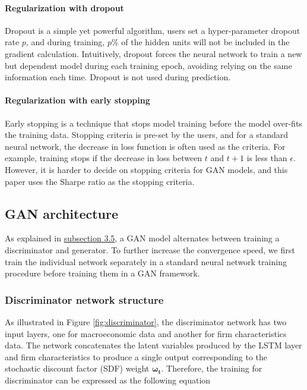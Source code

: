 \documentclass[12pt]{article}
\begin{document}
\hypertarget{regularization-with-dropout}{%
\paragraph{Regularization with dropout}\label{regularization-with-dropout}}

Dropout is a simple yet powerful algorithm, users set a
hyper-parameter dropout rate \(p\), and during training, \(p\)\%
of the hidden units will not be included in the gradient
calculation. Intuitively, dropout forces the neural network
to train a new but dependent model during each training
epoch, avoiding relying on the same information each time.
Dropout is not used during prediction.

\hypertarget{regularization-with-early-stopping}{%
\paragraph{Regularization with early stopping}\label{regularization-with-early-stopping}}

Early stopping is a technique that stops model training
before the model over-fits the training data. Stopping
criteria is pre-set by the users, and for a standard neural
network, the decrease in loss function is often used as the
criteria. For example, training stops if the decrease in loss between \(t\)
and \(t+1\) is less than \(\epsilon\). However, it is
harder to decide on stopping criteria for GAN models, and
this paper uses the Sharpe ratio as the stopping criteria.

\hypertarget{gan_structure}{%
\subsection{GAN architecture}\label{gan_structure}}

As explained in \protect\hyperlink{GAN_model}{subsection 3.5}, a GAN model
alternates between training a discriminator and generator.
To further increase the convergence speed,
we first train the individual network separately in a
standard neural network training procedure before training
them in a GAN framework.

\hypertarget{discriminator-network-structure}{%
\subsubsection{Discriminator network structure}\label{discriminator-network-structure}}

As illustrated in Figure \ref{fig:discriminator}, the discriminator network has
two input layers, one for macroeconomic data and another
for firm characteristics data. The network concatenates the
latent variables produced by the LSTM layer
and firm characteristics to produce a single output
corresponding to the stochastic discount factor (SDF) weight
\(\mathbf{\omega_t}\). Therefore, the training for discriminator
can be expressed as the following equation
\end{document}
